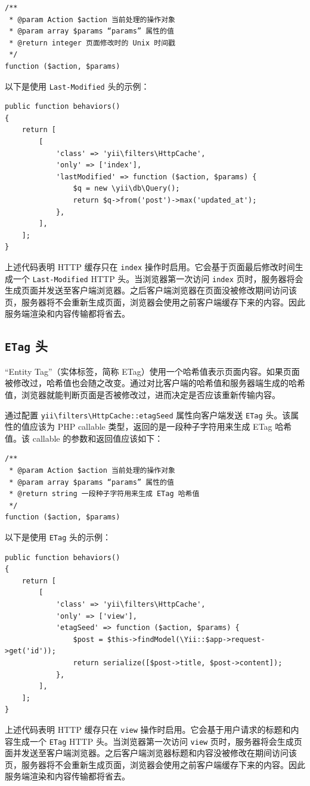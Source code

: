 \lstset{language=php}\begin{lstlisting}
/**
 * @param Action $action 当前处理的操作对象
 * @param array $params “params” 属性的值
 * @return integer 页面修改时的 Unix 时间戳
 */
function ($action, $params)
\end{lstlisting}
以下是使用 \lstinline|Last-Modified| 头的示例：

\lstset{language=php}\begin{lstlisting}
public function behaviors()
{
    return [
        [
            'class' => 'yii\filters\HttpCache',
            'only' => ['index'],
            'lastModified' => function ($action, $params) {
                $q = new \yii\db\Query();
                return $q->from('post')->max('updated_at');
            },
        ],
    ];
}
\end{lstlisting}
上述代码表明 HTTP 缓存只在 \lstinline|index| 操作时启用。它会基于页面最后修改时间生成一个 \lstinline|Last-Modified| HTTP 头。当浏览器第一次访问 \lstinline|index| 页时，服务器将会生成页面并发送至客户端浏览器。之后客户端浏览器在页面没被修改期间访问该页，服务器将不会重新生成页面，浏览器会使用之前客户端缓存下来的内容。因此服务端渲染和内容传输都将省去。

\subsection{\lstinline|ETag| 头 \label{caching-http.md::etag}}
“Entity Tag”（实体标签，简称 ETag）使用一个哈希值表示页面内容。如果页面被修改过，哈希值也会随之改变。通过对比客户端的哈希值和服务器端生成的哈希值，浏览器就能判断页面是否被修改过，进而决定是否应该重新传输内容。

通过配置 \texttt{yii{\allowbreak{}\textbackslash}filters{\allowbreak{}\textbackslash}HttpCache\allowbreak{}::\allowbreak{}etagSeed} 属性向客户端发送 \lstinline|ETag| 头。该属性的值应该为 PHP callable 类型，返回的是一段种子字符用来生成 ETag 哈希值。该 callable 的参数和返回值应该如下：

\lstset{language=php}\begin{lstlisting}
/**
 * @param Action $action 当前处理的操作对象
 * @param array $params “params” 属性的值
 * @return string 一段种子字符用来生成 ETag 哈希值
 */
function ($action, $params)
\end{lstlisting}
以下是使用 \lstinline|ETag| 头的示例：

\lstset{language=php}\begin{lstlisting}
public function behaviors()
{
    return [
        [
            'class' => 'yii\filters\HttpCache',
            'only' => ['view'],
            'etagSeed' => function ($action, $params) {
                $post = $this->findModel(\Yii::$app->request->get('id'));
                return serialize([$post->title, $post->content]);
            },
        ],
    ];
}
\end{lstlisting}
上述代码表明 HTTP 缓存只在 \lstinline|view| 操作时启用。它会基于用户请求的标题和内容生成一个 \lstinline|ETag| HTTP 头。当浏览器第一次访问 \lstinline|view| 页时，服务器将会生成页面并发送至客户端浏览器。之后客户端浏览器标题和内容没被修改在期间访问该页，服务器将不会重新生成页面，浏览器会使用之前客户端缓存下来的内容。因此服务端渲染和内容传输都将省去。

